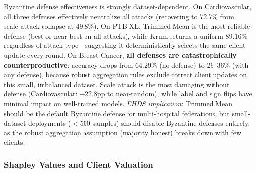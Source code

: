 \documentclass[conference]{IEEEtran}
\begin{document}
\begin{table}[htbp]
\centering
\caption{Byzantine Robustness: Accuracy (\%) by Attack and Defense}
\label{tab:byzantine_extended}

\vspace{1mm}
\footnotesize{Byzantine defense effectiveness is strongly dataset-dependent. On Cardiovascular, all three defenses effectively neutralize all attacks (recovering to 72.7\% from scale-attack collapse at 49.8\%). On PTB-XL, Trimmed Mean is the most reliable defense (best or near-best on all attacks), while Krum returns a uniform 89.16\% regardless of attack type---suggesting it deterministically selects the same client update every round. On Breast Cancer, \textbf{all defenses are catastrophically counterproductive}: accuracy drops from 64.29\% (no defense) to 29--36\% (with any defense), because robust aggregation rules exclude correct client updates on this small, imbalanced dataset. Scale attack is the most damaging without defense (Cardiovascular: $-$22.8pp to near-random), while label and sign flips have minimal impact on well-trained models. \textit{EHDS implication}: Trimmed Mean should be the default Byzantine defense for multi-hospital federations, but small-dataset deployments ($<$500 samples) should disable Byzantine defenses entirely, as the robust aggregation assumption (majority honest) breaks down with few clients.}
\end{table}


\subsubsection{Shapley Values and Client Valuation}
\label{sec:shapley_values}
\end{document}
